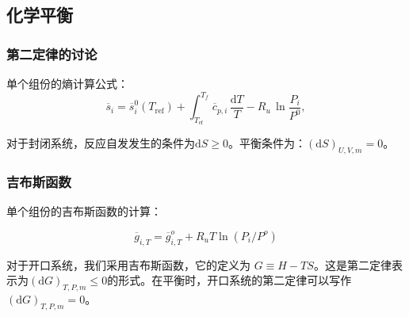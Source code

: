 \subsection{化学平衡}
\subsubsection{第二定律的讨论}

单个组份的熵计算公式：
\begin{equation}
    \overline{{{s}}}_{i}=\overline{{{s}}}_{i}^{0}(T_{\mathrm{ref}})+\int_{T_{\mathrm{ef}}}^{T_{f}}\overline{{{c}}}_{p,i}\,\frac{\mathrm{d}T}{T}-R_{u}\,\ln\frac{P_{i}}{P^{0}},
\end{equation}

对于封闭系统，反应自发发生的条件为$\mathrm{d}S\ge 0$。平衡条件为：$(\mathrm{d}S)_{U,V,m}=0$。

\subsubsection{吉布斯函数}

单个组份的吉布斯函数的计算：

\begin{equation}
    \overline{{{g}}}_{i,T}=\overline{{{g}}}_{i,T}^{o}+R_{u}T\ln\left(P_{i}/P^{o}\right)
\end{equation}

对于开口系统，我们采用吉布斯函数，它的定义为 $G\equiv H-TS$。这是第二定律表示为$(\mathrm{d}G)_{T,P,m}\le 0$的形式。在平衡时，开口系统的第二定律可以写作$(\mathrm{d}G)_{T,P,m}=0$。

